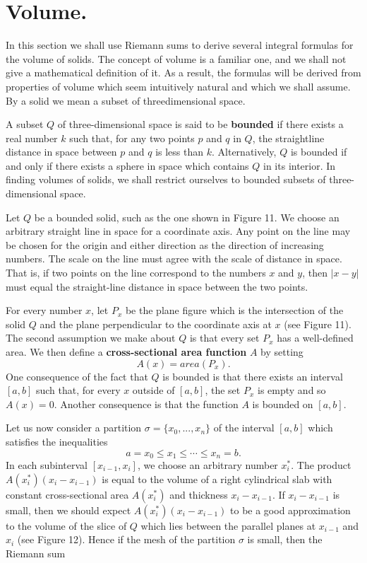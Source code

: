 \section{Volume.}
 In this section we shall use Riemann sums to derive several integral formulas for the volume of solids. The concept of volume is a familiar one, and we shall not give a mathematical definition of it. As a result, the
formulas will be derived from properties of volume which seem intuitively natural and which we shall assume. By a solid we mean a subset of threedimensional space.

A subset $Q$ of three-dimensional space is said to be \textbf{bounded} if there exists a real number $k$ such that, for any two points $p$ and $q$ in $Q$, the straightline distance in space between $p$ and $q$ is less than $k$. Alternatively, $Q$ is bounded if and only if there exists a sphere in space which contains $Q$ in its interior. In finding volumes of solids, we shall restrict ourselves to bounded subsets of three-dimensional space.

Let $Q$ be a bounded solid, such as the one shown in Figure 11. We choose an arbitrary straight line in space for a coordinate axis. Any point
on the line may be chosen for the origin and either direction as the direction of increasing numbers. The scale on the line must agree with the scale of distance in space. That is, if two points on the line correspond to the numbers $x$ and $y$, then $|x - y|$ must equal the straight-line distance in space between the two points.


For every number $x$, let $P_x$ be the plane figure which is the intersection of the solid $Q$ and the plane perpendicular to the coordinate axis at $x$ (see Figure 11). The second assumption we make about $Q$ is that every set $P_x$ has a well-defined area. We then define a \textbf{cross-sectional area function} $A$ by setting
$$
A(x)= area(P_x).
$$
\noindent One consequence of the fact that $Q$ is bounded is that there exists an interval $[a, b]$ such that, for every $x$ outside of $[a, b]$, the set $P_x$ is empty and so $A(x)= 0$. Another consequence is that the function $A$ is bounded on $[a, b]$.

Let us now consider a partition $ \sigma = \{ x_0, ..., x_n \}$ of the interval $[a, b]$ which satisfies the inequalities 
$$
a = x_0 \leq x_1 \leq \cdots  \leq x_n = b .
$$
\noindent In each subinterval $[x_{i-1}, x_i]$, we choose an arbitrary number $x_i^*$. The product $A(x_i^*)(x_i - x_{i-1})$ is equal to the volume of a right cylindrical slab with constant cross-sectional area $A(x_i^*)$ and thickness $x_i - x_{i-1}$. If $x_i - x_{i-1}$ is small, then we should expect $A(x_i^*)(x_i - x_{i-1})$ to be a good approximation to the volume of the slice of $Q$ which lies between the parallel planes at $x_{i-1}$ and $x_i$ (see Figure 12). Hence if the mesh of the partition $\sigma$ is small, then the Riemann sum

